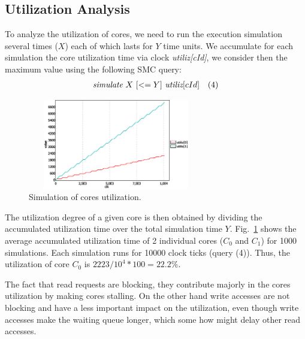 																	
\subsection{Utilization Analysis}
To analyze the utilization of cores, we need to run the execution simulation several times ($X$) each of which lasts for $Y$ time units. We accumulate for each simulation the core utilization time via clock \emph{utiliz[cId]}, we consider then the maximum value using the following SMC query:
\[ \begin{array}{ll} \emph{simulate}~ X~ [<=Y]~ {\emph{utiliz}[cId]} &(4) \end{array}\]

\begin{figure}[ht!]
\centering
\vspace{-5mm}
\caption{Simulation of cores utilization.}
\label{fig:core0_utiliz_simul}
\includegraphics[width=77mm,height=39mm]{Core0_utiliz_Simulation2.eps}
\vspace{-4mm}
\end{figure}

The utilization degree of a given core is then obtained by dividing the accumulated utilization time over the total simulation time $Y$. Fig.~\ref{fig:core0_utiliz_simul} shows the average accumulated utilization time of 2 individual cores ($C_0$ and $C_1$) for 1000 simulations. Each simulation runs for 10000 clock ticks (query (4)). Thus, the utilization of core $C_0$ is $2223/10^4*100=22.2\%$. %

The fact that read requests are blocking, they contribute majorly in the cores utilization by making cores stalling.  
On the other hand write accesses are not blocking and have a less important impact on the utilization, even though write accesses make the waiting queue longer, which some how might delay other read accesses.

